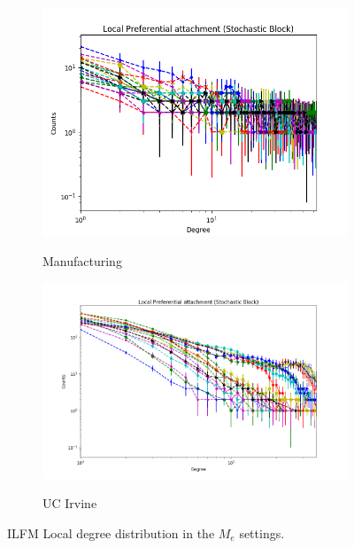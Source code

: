 \begin{figure}[h]
\begin{subfigure}[b]{0.300\textwidth}
            \centering
            \includegraphics[width=\textwidth]{img/expe/5_ibp/figure_2}
            \label{fig:mean and std of net14}
            \caption {{\small Manufacturing}}    
        \end{subfigure}
        \begin{subfigure}[b]{0.300\textwidth}
            \centering
            \includegraphics[width=\textwidth]{img/expe/6_ibp/figure_2}
            \label{fig:mean and std of net14}
            \caption {{\small UC Irvine}}    
        \end{subfigure}
        \caption{ILFM Local degree distribution in the $M_e$ settings. } 
        \label{fig:me_fit_lburst_ibp}
\end{figure}
